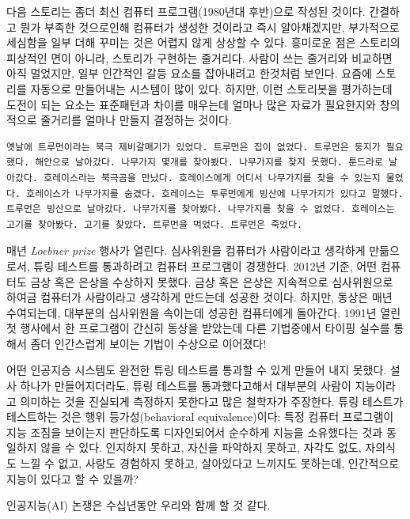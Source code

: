\documentclass[]{article}
\begin{document}
다음 스토리는 좀더 최신 컴퓨터 프로그램(1980년대 후반)으로 작성된
것이다. 간결하고 뭔가 부족한 것으로인해 컴퓨터가 생성한 것이라고 즉시
알아채겠지만, 부가적으로 세심함을 일부 더해 꾸미는 것은 어렵지 않게
상상할 수 있다. 흥미로운 점은 스토리의 피상적인 면이 아니라, 스토리가
구현하는 줄거리다. 사람이 쓰는 줄거리와 비교하면 아직 멀었지만, 일부
인간적인 갈등 요소를 잡아내려고 한것처럼 보인다. 요즘에 스토리를
자동으로 만들어내는 시스템이 많이 있다. 하지만, 이런 스토리봇을
평가하는데 도전이 되는 요소는 표준패턴과 차이를 매우는데 얼마나 많은
자료가 필요한지와 창의적으로 줄거리를 얼마나 만들지 결정하는 것이다.

\begin{verbatim}
옛날에 트루먼이라는 북극 제비갈매기가 있었다. 트루먼은 집이 없었다. 트루먼은 둥지가 필요했다. 해안으로 날아갔다. 나무가지 몇개를 찾아봤다. 나무가지를 찾지 못했다. 툰드라로 날아갔다. 호레이스라는 북극곰을 만났다. 호레이스에게 어디서 나무가지를 찾을 수 있는지 물었다. 호레이스가 나무가지를 숨겼다. 호레이스는 투루먼에게 빙산에 나무가지가 있다고 말했다. 트루먼은 빙산으로 날아갔다. 나무가지를 찾아봤다. 나무가지를 찾을 수 없었다. 호레이스는 고기를 찾아봤다. 고기를 찾았다. 트루먼을 먹었다. 트루먼은 죽었다.
\end{verbatim}

매년 \emph{Loebner prize} 행사가 열린다. 심사위원을 컴퓨터가 사람이라고
생각하게 만듦으로서, 튜링 테스트를 통과하려고 컴퓨터 프로그램이
경쟁한다. 2012년 기준, 어떤 컴퓨터도 금상 혹은 은상을 수상하지 못했다.
금상 혹은 은상은 지속적으로 심사위원으로 하여금 컴퓨터가 사람이라고
생각하게 만드는데 성공한 것이다. 하지만, 동상은 매년 수여되는데,
대부분의 심사위원을 속이는데 성공한 컴퓨터에게 돌아간다. 1991년 열린 첫
행사에서 한 프로그램이 간신히 동상을 받았는데 다른 기법중에서 타이핑
실수를 통해서 좀더 인간스럽게 보이는 기법이 수상으로 이어졌다!

어떤 인공지승 시스템도 완전한 튜링 테스트를 통과할 수 있게 만들어 내지
못했다. 설사 하나가 만들어지더라도, 튜링 테스트를 통과했다고해서
대부분의 사람이 지능이라고 의미하는 것을 진실되게 측정하지 못한다고 많은
철학자가 주장한다. 튜링 테스트가 테스트하는 것은 행위 등가성(behavioral
equivalence)이다: 특정 컴퓨터 프로그램이 지능 조짐을 보이는지 판단하도록
디자인되어서 순수하게 지능을 소유했다는 것과 동일하지 않을 수 있다.
인지하지 못하고, 자신을 파악하지 못하고, 자각도 없도, 자의식도 느낄 수
없고, 사랑도 경험하지 못하고, 살아있다고 느끼지도 못하는데, 인간적으로
지능이 있다고 할 수 있을까?

인공지능(AI) 논쟁은 수십년동안 우리와 함께 할 것 같다.
\end{document}
